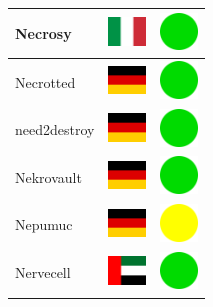 \documentclass[12pt, a4paper, twoside]{report}
\begin{document}
\begin{center}
\begin{longtable}{|p{5cm}|p{2cm}|p{2cm}|}
 Necrosy                                                    & \includegraphics[width=1cm]{../4x3/it} &   \includegraphics[width=1cm]{../likes/y} \\ \hline
 Necrotted                                                  & \includegraphics[width=1cm]{../4x3/de} &   \includegraphics[width=1cm]{../likes/y} \\ \hline
 need2destroy                                               & \includegraphics[width=1cm]{../4x3/de} &   \includegraphics[width=1cm]{../likes/y} \\ \hline
 Nekrovault                                                 & \includegraphics[width=1cm]{../4x3/de} &   \includegraphics[width=1cm]{../likes/y} \\ \hline
 Nepumuc                                                    & \includegraphics[width=1cm]{../4x3/de} &   \includegraphics[width=1cm]{../likes/m} \\ \hline
 Nervecell                                                  & \includegraphics[width=1cm]{../4x3/ae} &   \includegraphics[width=1cm]{../likes/y} \\ \hline

\end{longtable}
\end{center}
\end{document}

